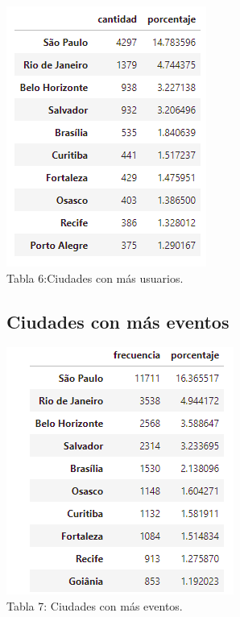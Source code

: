 \documentclass[a4paper ,12pt]{article}
\begin{document}
\begin{center}
	\includegraphics[width=0.5\linewidth]{table_6}
	\\Tabla 6:Ciudades con más usuarios.
	
\end{center}

\subsection{Ciudades con más eventos}

\begin{center}
	\includegraphics[width=0.5\linewidth]{table_7}
	\\Tabla 7: Ciudades con más eventos.
	
\end{center}
\end{document}
